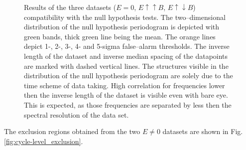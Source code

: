 \begin{figure}[h!]
  \label{fig:cycle-level_detection}
  \caption{Results of the three datasets ($E=0$, $E \uparrow \uparrow B$, $E \uparrow \downarrow B$) compatibility with the null hypothesis tests. The two--dimensional distribution of the null hypothesis periodogram is depicted with green bands, thick green line being the mean. The orange lines depict 1-, 2-, 3-, 4- and 5-sigma false--alarm thresholds. The inverse length of the dataset and inverse median spacing of the datapoints are marked with dashed vertical lines. The structures visible in the distribution of the null hypothesis periodogram are solely due to the time scheme of data taking. High correlation for frequencies lower then the inverse length of the dataset is visible even with bare eye. This is expected, as those frequencies are separated by less then the spectral resolution of the data set.}
\end{figure}

%
%

The exclusion regions obtained from the two $E \neq 0$ datasets are shown in Fig.\,\ref{fig:cycle-level_exclusion}.

